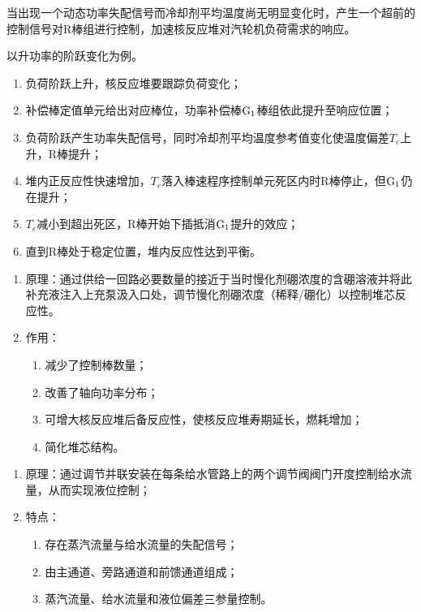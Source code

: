 \begin{exercise} %
    当出现一个动态功率失配信号而冷却剂平均温度尚无明显变化时，产生一个超前的控制信号对R棒组进行控制，加速核反应堆对汽轮机负荷需求的响应。
\end{exercise}

\begin{exercise} %
    以升功率的阶跃变化为例。
    \begin{enumerate}
        \item 负荷阶跃上升，核反应堆要跟踪负荷变化；
        \item 补偿棒定值单元给出对应棒位，功率补偿棒${\rm G_1}$棒组依此提升至响应位置；
        \item 负荷阶跃产生功率失配信号，同时冷却剂平均温度参考值变化使温度偏差$T_e$上升，R棒提升；
        \item 堆内正反应性快速增加，$T_e$落入棒速程序控制单元死区内时R棒停止，但${\rm G_1}$仍在提升；
        \item $T_e$减小到超出死区，R棒开始下插抵消${\rm G_1}$提升的效应；
        \item 直到R棒处于稳定位置，堆内反应性达到平衡。
    \end{enumerate}
\end{exercise}

\begin{exercise} %
    \begin{enumerate}
        \item 原理：通过供给一回路必要数量的接近于当时慢化剂硼浓度的含硼溶液并将此补充液注入上充泵汲入口处，调节慢化剂硼浓度（稀释/硼化）以控制堆芯反应性。
        \item 作用：
        \begin{enumerate}
            \item 减少了控制棒数量；
            \item 改善了轴向功率分布；
            \item 可增大核反应堆后备反应性，使核反应堆寿期延长，燃耗增加；
            \item 简化堆芯结构。
        \end{enumerate}
    \end{enumerate}
\end{exercise}

\begin{exercise} %
    \begin{enumerate}
        \item 原理：通过调节并联安装在每条给水管路上的两个调节阀阀门开度控制给水流量，从而实现液位控制；
        \item 特点：
        \begin{enumerate}
            \item 存在蒸汽流量与给水流量的失配信号；
            \item 由主通道、旁路通道和前馈通道组成；
            \item 蒸汽流量、给水流量和液位偏差三参量控制。
        \end{enumerate}
    \end{enumerate}
\end{exercise}

